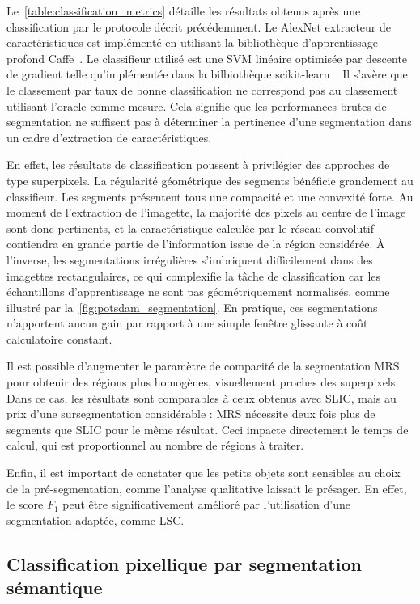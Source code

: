 Le~\cref{table:classification_metrics} détaille les résultats obtenus après une classification par le protocole décrit précédemment. Le AlexNet extracteur de caractéristiques est implémenté en utilisant la bibliothèque d'apprentissage profond Caffe~\cite{jia_caffe_2014}. Le classifieur utilisé est une \gls{SVM} linéaire optimisée par descente de gradient telle qu'implémentée dans la bilbiothèque scikit-learn~\cite{pedregosa_scikit-learn_2011}.
Il s'avère que le classement par taux de bonne classification ne correspond pas au classement utilisant l'oracle comme mesure. Cela signifie que les performances brutes de segmentation ne suffisent pas à déterminer la pertinence d'une segmentation dans un cadre d'extraction de caractéristiques.

En effet, les résultats de classification poussent à privilégier des approches de type superpixels. La régularité géométrique des segments bénéficie grandement au classifieur. Les segments présentent tous une compacité et une convexité forte. Au moment de l'extraction de l'imagette, la majorité des pixels au centre de l'image sont donc pertinents, et la caractéristique calculée par le réseau convolutif contiendra en grande partie de l'information issue de la région considérée. À l'inverse, les segmentations irrégulières s'imbriquent difficilement dans des imagettes rectangulaires, ce qui complexifie la tâche de classification car les échantillons d'apprentissage ne sont pas géométriquement normalisés, comme illustré par la~\cref{fig:potsdam_segmentation}. En pratique, ces segmentations n'apportent aucun gain par rapport à une simple fenêtre glissante à coût calculatoire constant.

Il est possible d'augmenter le paramètre de compacité de la segmentation \gls{MRS} pour obtenir des régions plus homogènes, visuellement proches des superpixels. Dans ce cas, les résultats sont comparables à ceux obtenus avec \gls{SLIC}, mais au prix d'une sursegmentation considérable : \gls{MRS} nécessite deux fois plus de segments que \gls{SLIC} pour le même résultat. Ceci impacte directement le temps de calcul, qui est proportionnel au nombre de régions à traiter.

Enfin, il est important de constater que les petits objets sont sensibles au choix de la pré-segmentation, comme l'analyse qualitative laissait le présager. En effet, le score $F_1$ peut être significativement amélioré par l'utilisation d'une segmentation adaptée, comme \gls{LSC}.

\subsection{Classification pixellique par segmentation sémantique}

